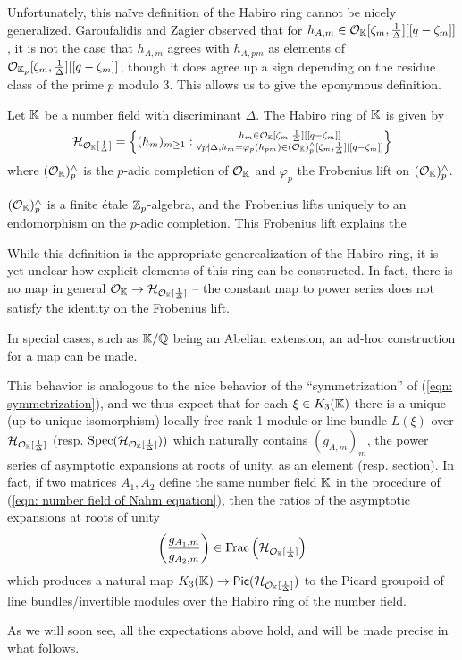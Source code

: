Unfortunately, this na\"{i}ve definition of the Habiro ring cannot be nicely generalized. Garoufalidis and Zagier observed that for $h_{A,m}\in\mathcal{O}_{\mathbb{K}}[\zeta_{m},\frac{1}{\Delta}][[q-\zeta_{m}]]$, it is not the case that $h_{A,m}$ agrees with $h_{A,pm}$ as elements of $\mathcal{O}_{\mathbb{K}_{p}}[\zeta_{m},\frac{1}{\Delta}][[q-\zeta_{m}]]$, though it does agree up a sign depending on the residue class of the prime $p$ modulo 3. This allows us to give the eponymous definition. 
\begin{definition}\label{def: Habiro ring of a number field}
    Let $\mathbb{K}$ be a number field with discriminant $\Delta$. The Habiro ring of $\mathbb{K}$ is given by 
    $$\mathcal{H}_{\mathcal{O}_{\mathbb{K}}[\frac{1}{\Delta}]}=\left\{(h_{m})_{m\geq1}:\substack{h_{m}\in\mathcal{O}_{\mathbb{K}}[\zeta_{m},\frac{1}{\Delta}][[q-\zeta_{m}]] \\
    \forall p\nmid\Delta, h_{m}=\varphi_{p}(h_{pm})\in(\mathcal{O}_{\mathbb{K}})_{p}^{\wedge}[\zeta_{m},\frac{1}{\Delta}][[q-\zeta_{m}]]}\right\}$$
    where $(\mathcal{O}_{\mathbb{K}})_{p}^{\wedge}$ is the $p$-adic completion of $\mathcal{O}_{\mathbb{K}}$ and $\varphi_{p}$ the Frobenius lift on $(\mathcal{O}_{\mathbb{K}})_{p}^{\wedge}$. 
\end{definition}
\begin{remark}
    $(\mathcal{O}_{\mathbb{K}})_{p}^{\wedge}$ is a finite \'{e}tale $\mathbb{Z}_{p}$-algebra, and the Frobenius lifts uniquely to an endomorphism on the $p$-adic completion. This Frobenius lift explains the 
\end{remark}
While this definition is the appropriate generealization of the Habiro ring, it is yet unclear how explicit elements of this ring can be constructed. In fact, there is no map in general $\mathcal{O}_{\mathbb{K}}\to\mathcal{H}_{\mathcal{O}_{\mathbb{K}}[\frac{1}{\Delta}]}$ -- the constant map to power series does not satisfy the identity on the Frobenius lift. 
\begin{remark}
    In special cases, such as $\mathbb{K}/\mathbb{Q}$ being an Abelian extension, an ad-hoc construction for a map can be made. 
\end{remark}
This behavior is analogous to the nice behavior of the ``symmetrization'' of (\ref{eqn: symmetrization}), and we thus expect that for each $\xi\in K_{3}(\mathbb{K})$ there is a unique (up to unique isomorphism) locally free rank 1 module or line bundle $L(\xi)$ over $\mathcal{H}_{\mathcal{O}_{\mathbb{K}}[\frac{1}{\Delta}]}$ (resp. $\operatorname{Spec}(\mathcal{H}_{\mathcal{O}_{\mathbb{K}}[\frac{1}{\Delta}]}))$ which naturally contains $(g_{A,m})_{m}$, the power series of asymptotic expansions at roots of unity, as an element (resp. section). In fact, if two matrices $A_{1},A_{2}$ define the same number field $\mathbb{K}$ in the procedure of (\ref{eqn: number field of Nahm equation}), then the ratios of the asymptotic expansions at roots of unity
$$\left(\frac{g_{A_{1},m}}{g_{A_{2},m}}\right)\in\mathrm{Frac}\left(\mathcal{H}_{\mathcal{O}_{\mathbb{K}}[\frac{1}{\Delta}]}\right)$$
which produces a natural map $K_{3}(\mathbb{K})\to\mathsf{Pic}(\mathcal{H}_{\mathcal{O}_{\mathbb{K}}[\frac{1}{\Delta}]})$ to the Picard groupoid of line bundles/invertible modules over the Habiro ring of the number field. 

As we will soon see, all the expectations above hold, and will be made precise in what follows. 
